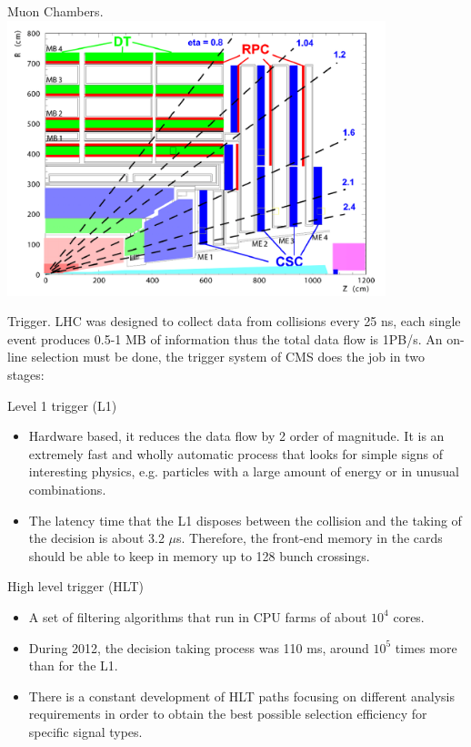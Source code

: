 \documentclass[8pt]{beamer}
\begin{document}
\begin{frame}[fragile]{Muon Chambers.}
	\includegraphics[width=11cm]{16}
\end{frame}
\begin{frame}[fragile]{Trigger.}
	LHC was designed to collect data from collisions every 25 ns, each single event produces 0.5-1 MB of information thus the total data flow is 1PB/s.	An on-line selection must be done, the trigger system of CMS does the job in two stages: 
		\begin{exampleblock}{Level 1 trigger (L1)}
			\begin{itemize}
				\item Hardware based, it reduces the data flow by 2 order of magnitude. It is an extremely fast and wholly automatic process that looks for simple signs of interesting physics, e.g. particles with a large amount of energy or in unusual combinations.
				\item The latency time that the L1 disposes between the
				collision and the taking of the decision is about 3.2 $\mu$s. Therefore, the front-end
				memory in the cards should be able to keep in memory up to 128 bunch crossings.
			\end{itemize}

			
		\end{exampleblock}
			\begin{exampleblock}{High level trigger (HLT)}
				\begin{itemize}
					\item 	A set of filtering algorithms that run in CPU farms of about $10^4$ cores. 
					\item During 2012, the decision taking process was 110 ms, around $10^5$ times more than for the L1.
					\item  There is a constant development of HLT paths focusing on different analysis requirements in order to obtain the best possible selection efficiency for specific signal types.
					
				\end{itemize}
				
			
				
				
			\end{exampleblock}
\end{frame}
\end{document}
